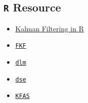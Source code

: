 \documentclass{article}
\newcommand{\code}[1]{\texttt{#1}}
\begin{document}
\subsection{\code{R} Resource}
\begin{itemize}
\item \href{http://core.ac.uk/download/pdf/6340262.pdf}{Kalman Filtering in R}
\item \href{https://cran.r-project.org/web/packages/FKF/FKF.pdf}{\tt FKF}
\item \href{https://cran.r-project.org/web/packages/dlm/dlm.pdf}{\tt dlm}
\item \href{https://cran.r-project.org/web/packages/dse/dse.pdf}{\tt dse}
\item \href{https://cran.r-project.org/web/packages/KFAS/KFAS.pdf}{\tt KFAS}
\end{itemize}


\end{document}
